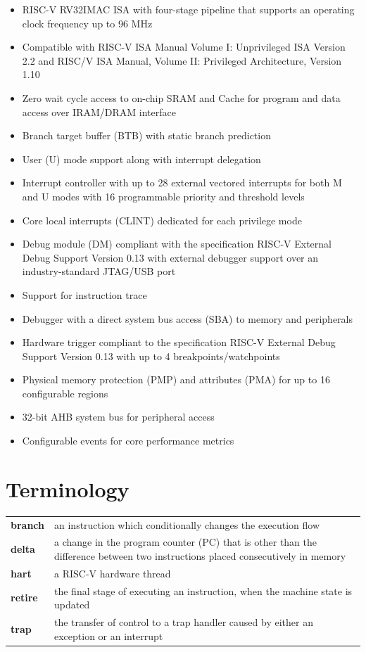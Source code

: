 \documentclass[main\_\_EN.tex]{subfiles}
\begin{document}
\begin{itemize}
    \item RISC-V RV32IMAC ISA with four-stage pipeline that supports an operating clock frequency up to 96 MHz
    \item Compatible with RISC-V ISA Manual Volume I: Unprivileged ISA Version 2.2 and RISC\-/V ISA Manual, Volume II: Privileged Architecture, Version 1.10
    \item Zero wait cycle access to on-chip SRAM and Cache for program and data access over IRAM/DRAM interface
    \item Branch target buffer (BTB) with static branch prediction
    \item User (U) mode support along with interrupt delegation
    \item Interrupt controller with up to 28 external vectored interrupts for both M and U modes with 16 programmable priority and threshold levels
    \item Core local interrupts (CLINT) dedicated for each privilege mode
    \item Debug module (DM) compliant with the specification RISC-V External Debug Support Version 0.13 with external debugger support over an industry-standard JTAG/USB port
    \item Support for instruction trace
    \item Debugger with a direct system bus access (SBA) to memory and peripherals
    \item Hardware trigger compliant to the specification RISC-V External Debug Support Version 0.13 with up to 4 breakpoints/watchpoints
    \item Physical memory protection (PMP) and attributes (PMA) for up to 16 configurable regions
    \item 32-bit AHB system bus for peripheral access
    \item Configurable events for core performance metrics
\end{itemize}

\section{Terminology}

\begin{longtable}[c]{ R{2cm} p{12cm} }
\textbf{branch} & an instruction which conditionally changes the execution flow \\
\textbf{delta} & a change in the program counter (PC) that is other than the difference between two instructions placed consecutively in memory \\
\textbf{hart} &  a RISC-V hardware thread \\
\textbf{retire} & the final stage of executing an instruction, when the machine state is updated \\
\textbf{trap} & the transfer of control to a trap handler caused by either an exception or an interrupt \\
\end{longtable}
\end{document}
